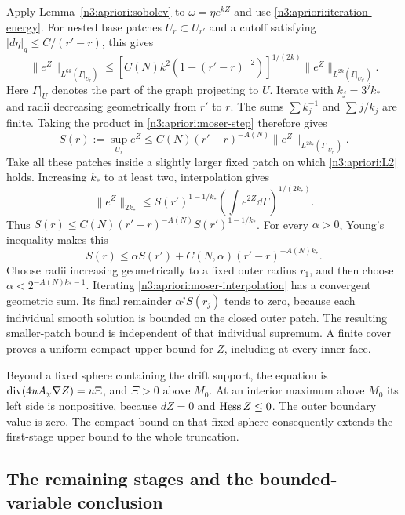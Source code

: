 Apply Lemma~\ref{n3:apriori:sobolev} to $\omega=\eta e^{kZ}$ and use
\eqref{n3:apriori:iteration-energy}.  For nested base patches
$U_r\subset U_{r'}$ and a cutoff satisfying
$|d\eta|_g\le C/(r'-r)$, this gives
\begin{equation}
 \|e^Z\|_{L^{6k}(\Gamma|_{U_r})}
 \le\left[C(N)k^2(1+(r'-r)^{-2})\right]^{1/(2k)}
                  \|e^Z\|_{L^{2k}(\Gamma|_{U_{r'}})}.
 \label{n3:apriori:moser-step}
\end{equation}
Here $\Gamma|_U$ denotes the part of the graph projecting to $U$.
Iterate with $k_j=3^jk_*$ and radii decreasing geometrically from
$r'$ to $r$.  The sums $\sum k_j^{-1}$ and $\sum j/k_j$ are finite.
Taking the product in \eqref{n3:apriori:moser-step} therefore gives
\begin{equation}
 S(r):=\sup_{U_r}e^Z
 \le C(N)(r'-r)^{-A(N)}
             \|e^Z\|_{L^{2k_*}(\Gamma|_{U_{r'}})}.
 \label{n3:apriori:moser-high-norm}
\end{equation}
Take all these patches inside a slightly larger fixed patch on
which \eqref{n3:apriori:L2} holds.  Increasing $k_*$ to at least two,
interpolation gives
\[
 \|e^Z\|_{2k_*}
 \le S(r')^{1-1/k_*}
                  \left(\int e^{2Z}\dd\Gamma\right)^{1/(2k_*)}.
\]
Thus $S(r)\le C(N)(r'-r)^{-A(N)}S(r')^{1-1/k_*}$.
For every $\alpha>0$, Young's inequality makes this
\begin{equation}
 S(r)\le\alpha S(r')+
                   C(N,\alpha)(r'-r)^{-A(N)k_*}.
 \label{n3:apriori:moser-interpolation}
\end{equation}
Choose radii increasing geometrically to a fixed outer radius $r_1$,
and then choose $\alpha<2^{-A(N)k_*-1}$.  Iterating
\eqref{n3:apriori:moser-interpolation} has a convergent geometric sum.
Its final remainder $\alpha^jS(r_j)$ tends to zero, because each
individual smooth solution is bounded on the closed outer patch.
The resulting smaller-patch bound is independent of that individual
supremum.  A finite cover proves a uniform compact upper bound for
$Z$, including at every inner face.

Beyond a fixed sphere containing the drift support, the equation is
$\operatorname{div}(4uA_\chi\nabla Z)=u\Xi$, and $\Xi>0$ above $M_0$.
At an interior maximum above $M_0$ its left side is nonpositive,
because $dZ=0$ and $\operatorname{Hess} Z\le0$.  The outer boundary value is zero.
The compact bound on that fixed sphere consequently extends the
first-stage upper bound to the whole truncation.

\subsection{The remaining stages and the bounded-variable conclusion}

